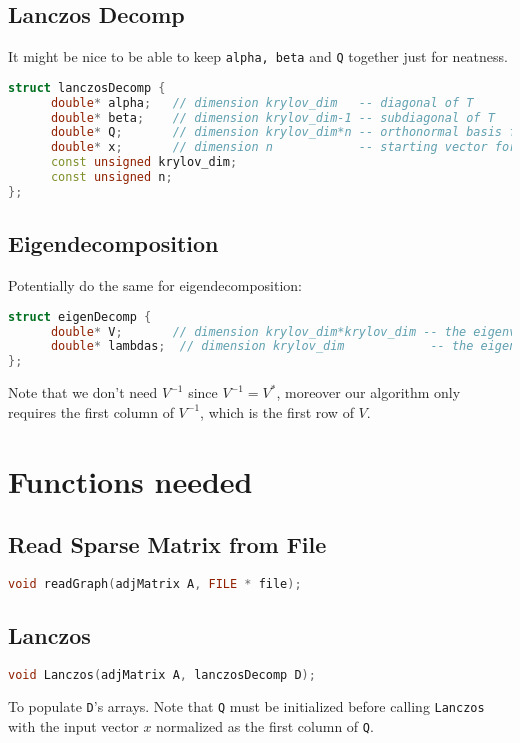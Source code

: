 \documentclass[a4paper, fleqn]{article}
\begin{document}
\subsection{Lanczos Decomp}%
\label{sub:lanczos_decomp}
It might be nice to be able to keep \texttt{alpha, beta} and \texttt{Q} together just for neatness.  
\begin{lstlisting}[language = C++]
struct lanczosDecomp {
      double* alpha;   // dimension krylov_dim   -- diagonal of T
      double* beta;    // dimension krylov_dim-1 -- subdiagonal of T
      double* Q;       // dimension krylov_dim*n -- orthonormal basis for Krylov subspace
      double* x;       // dimension n            -- starting vector for Krylov subspace
      const unsigned krylov_dim;
      const unsigned n;
};
\end{lstlisting}

\subsection{Eigendecomposition}%
\label{sub:eig_decomp}
Potentially do the same for eigendecomposition:
\begin{lstlisting}[language = C++]
struct eigenDecomp {
      double* V;       // dimension krylov_dim*krylov_dim -- the eigenvectors of T
      double* lambdas;  // dimension krylov_dim            -- the eigenvalues of T
};
\end{lstlisting}
Note that we don't need $V^{-1}$ since $V^{-1} = V^*$, moreover our algorithm only requires the first column of $V^{-1}$, which is the first row of $V$.

\section{Functions needed}%
\label{sec:functions_needed}
\subsection{Read Sparse Matrix from File}%
\label{sub:read_sparse_matrix_from_file}
\begin{lstlisting}[language = C++]
void readGraph(adjMatrix A, FILE * file);
\end{lstlisting}


\subsection{ Lanczos }
\begin{lstlisting}[language = C++]
void Lanczos(adjMatrix A, lanczosDecomp D);
\end{lstlisting}
\label{sub:Lanczos}
To populate \texttt{D}'s arrays. Note that \texttt{Q} must be initialized before calling \texttt{Lanczos} with the input vector $x$ normalized as the first column of  \texttt{Q}.
\end{document}
